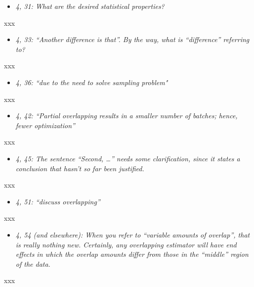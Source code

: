 \documentclass[11pt,notitlepage,onecolumn]{article}
\newcommand{\noi}{\noindent}
\begin{document}
\begin{itemize}
\item[] \textit{4, 31: What are the desired statistical properties?}
\end{itemize}

\noi
xxx  
\medskip 


\begin{itemize}
\item[] \textit{4, 33: ``Another difference is that''. By the way, what is ``difference'' referring to?}
\end{itemize}

\noi
xxx  
\medskip 


\begin{itemize}
\item[] \textit{4, 36: ``due to the need to solve sampling problem"}
\end{itemize}

\noi
xxx  
\medskip 


\begin{itemize}
\item[] \textit{4, 42: ``Partial overlapping results in a smaller number of batches; hence, fewer optimization''}
\end{itemize}

\noi
xxx  
\medskip 


\begin{itemize}
\item[] \textit{4, 45: The sentence ``Second, \ldots '' needs some clarification, since it states a conclusion that hasn't so far been justified.}
\end{itemize}

\noi
xxx  
\medskip 


\begin{itemize}
\item[] \textit{4, 51: ``discuss overlapping''}
\end{itemize}

\noi
xxx  
\medskip 


\begin{itemize}
\item[] \textit{4, 54 (and elsewhere): When you refer to ``variable amounts of overlap'', that is really nothing new. Certainly, any overlapping estimator will have end effects in which the overlap amounts differ from those in the ``middle'' region of the data.}
\end{itemize}

\noi
xxx  
\medskip 
\end{document}
